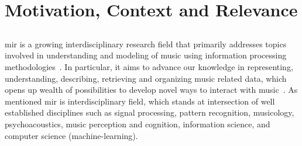 \section{Motivation, Context and Relevance}
\label{sec:intro_motivation_context_relevance}


\subsection{}
\label{sec:intro_motivation_mir}

\Gls{mir} is a growing interdisciplinary research field that primarily addresses topics involved in understanding and modeling of music using information processing methodologies~\citep{roadmap_mir}. In particular, it aims to advance our knowledge in representing, understanding, describing, retrieving and organizing music related data, which opens up wealth of possibilities to develop novel ways to interact with music~\citep{casey2008content,orio2006music,burgoyne2016music}. As mentioned \gls{mir} is interdisciplinary field, which stands at intersection of well established disciplines such as signal processing, pattern recognition, musicology, psychoacoustics, music perception and cognition, information science, and computer science (machine-learning). 

